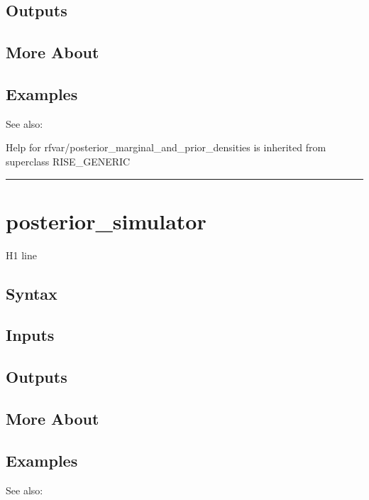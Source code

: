 \documentclass[letterpaper,10pt,english]{sphinxmanual}
\begin{document}
\subsection{Outputs}
\label{classes/models/@rfvar/rfvar:id95}

\subsection{More About}
\label{classes/models/@rfvar/rfvar:id96}

\subsection{Examples}
\label{classes/models/@rfvar/rfvar:id97}
See also:

Help for rfvar/posterior\_marginal\_and\_prior\_densities is inherited from superclass RISE\_GENERIC


\bigskip\hrule{}\bigskip



\section{posterior\_simulator}
\label{classes/models/@rfvar/rfvar:id98}\label{classes/models/@rfvar/rfvar:posterior-simulator}
H1 line


\subsection{Syntax}
\label{classes/models/@rfvar/rfvar:id99}

\subsection{Inputs}
\label{classes/models/@rfvar/rfvar:id100}

\subsection{Outputs}
\label{classes/models/@rfvar/rfvar:id101}

\subsection{More About}
\label{classes/models/@rfvar/rfvar:id102}

\subsection{Examples}
\label{classes/models/@rfvar/rfvar:id103}
See also:
\end{document}
